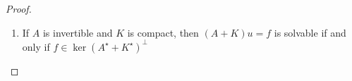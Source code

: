 \documentclass[oneside]{book}
\newcommand{\Ks}{K^{\star}}
\newcommand{\As}{A^{\star}}
\newcommand{\Ai}{A^{-1}}
\begin{document}
\begin{proof}
\begin{enumerate}
\begin{proof}
First, we note that 
\begin{equation}
A + K = A( I + \Ai K).
\end{equation}
Since $A+ K$ is injective, then, $I + \Ai K$ is injective since $A$ is invertible. Since $\Ai K$ is compact, then $I + \Ai K$ must be surjective. Therefore, since $A$ is surjective, we have that $A(I + \Ai K) =  A + K$ is surjective. \\
\indent Next, from (6), we get that 
\begin{equation}
\As + \Ks = \left(I + (\Ai K)^{\star}\right) \As.
\end{equation}
Then, we see that by the Fredholm Alternative,
\[ \dim \ker(A + K) = \dim \ker( I + \Ai K) = \dim \ker \left(I + (\Ai K)^{\star} \right).\]
From (7), we note that $u \in \ker(\As + \Ks)$ implies that $\As u \in \ker\left(I + (\Ai K)^{\star}\right)$. Therefore, the function that sends $u \to \As u$ from $\ker(\As + \Ks) \mapsto \ker\left(I + (\Ai K)^{\star}\right)$ is one-to-one. Thus, we have that by the Fredholm Alternative
\[ \dim\ker\left(I + (\Ai K)^{\star}\right) = \dim\ker(\As + \Ks)\]
\end{proof}
\item If $A$ is invertible and $K$ is compact, then $(A+ K) u = f$ is solvable if and only if $f \in \ker(\As + \Ks)^{\perp}$
\end{enumerate}

\end{proof}
\end{document}
